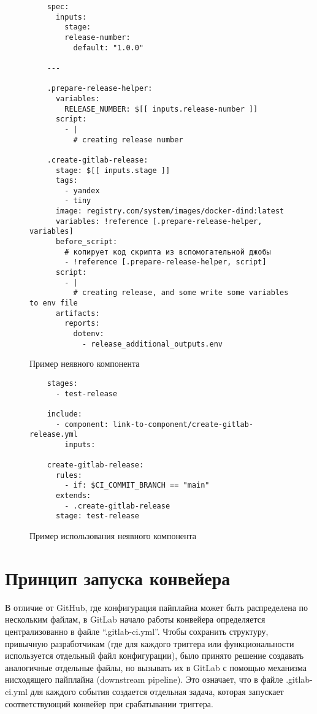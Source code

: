 \begin{figure}
  \centering
  \scriptsize
  \begin{verbatim}
    spec:
      inputs:
        stage:
        release-number:
          default: "1.0.0"

    ---

    .prepare-release-helper:
      variables:
        RELEASE_NUMBER: $[[ inputs.release-number ]]
      script:
        - |
          # creating release number

    .create-gitlab-release:
      stage: $[[ inputs.stage ]]
      tags:
        - yandex
        - tiny
      image: registry.com/system/images/docker-dind:latest
      variables: !reference [.prepare-release-helper, variables]
      before_script:
        # копирует код скрипта из вспомогательной джобы
        - !reference [.prepare-release-helper, script]
      script:
        - |
          # creating release, and some write some variables to env file
      artifacts:
        reports:
          dotenv:
            - release_additional_outputs.env
  \end{verbatim}
  \caption{Пример неявного компонента}
  \label{fig:implicit-component-code}
\end{figure}

\begin{figure}
  \centering
  \scriptsize
  \begin{verbatim}
    stages:
      - test-release

    include:
      - component: link-to-component/create-gitlab-release.yml
        inputs:

    create-gitlab-release:
      rules:
        - if: $CI_COMMIT_BRANCH == "main"
      extends:
        - .create-gitlab-release
      stage: test-release
  \end{verbatim}
  \caption{Пример использования неявного компонента}
  \label{fig:implicit-component-code-usage}
\end{figure}


\section{Принцип запуска конвейера}
В отличие от GitHub, где конфигурация пайплайна может быть распределена по нескольким файлам, в GitLab начало работы конвейера определяется централизованно в файле \enquote{.gitlab-ci.yml}. Чтобы сохранить структуру, привычную разработчикам (где для каждого триггера или функциональности используется отдельный файл конфигурации), было принято решение создавать аналогичные отдельные файлы, но вызывать их в GitLab с помощью механизма нисходящего пайплайна (downstream pipeline). Это означает, что в файле .gitlab-ci.yml для каждого события создается отдельная задача, которая запускает соответствующий конвейер при срабатывании триггера.

